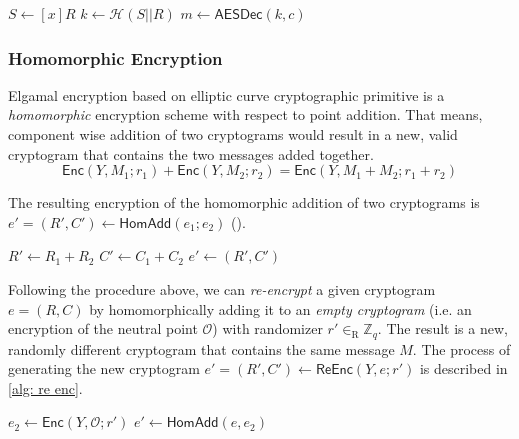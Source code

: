 \begin{algorithm}[ht]
    \DontPrintSemicolon
    \caption{$\mathsf{TxtDec} (x, e)$}
    
    $S \gets [x]R$ \;
    $k \gets \mathcal{H} (S || R)$ \;
    $m \gets \mathsf{AESDec} (k, c)$ \;
     
    
    \label{alg: txt dec}
\end{algorithm}


\subsubsection{Homomorphic Encryption}
Elgamal encryption based on elliptic curve cryptographic primitive is a \textit{homomorphic} encryption scheme with respect to point addition. That means, component wise addition of two cryptograms would result in a new, valid cryptogram that contains the two messages added together.
\[
\mathsf{Enc}(Y, M_1; r_1) + \mathsf{Enc}(Y, M_2; r_2) = \mathsf{Enc}(Y, M_1 + M_2; r_1 + r_2)
\]

The resulting encryption of the homomorphic addition of two cryptograms is $e' = (R', C') \gets \mathsf{HomAdd} (e_1; e_2)$ ().

\begin{algorithm}[ht]
    \DontPrintSemicolon
    \caption{$\mathsf{HomAdd}(e_1; e_2)$}
    
    $R' \gets R_1 + R_2$ \;
    $C' \gets C_1 + C_2$ \;
    $e' \gets (R', C')$\;
     
    
    \label{alg: hom add}
\end{algorithm}

Following the procedure above, we can \textit{re-encrypt} a given cryptogram $e = (R, C)$ by homomorphically adding it to an \textit{empty cryptogram} (i.e. an encryption of the neutral point $\mathcal{O}$) with randomizer $r' \in_\mathrm{R} \mathbb{Z}_q$. The result is a new, randomly different cryptogram that contains the same message $M$. The process of generating the new cryptogram $e' = (R', C') \gets \mathsf{ReEnc} (Y, e; r')$ is described in \cref{alg: re enc}.

\begin{algorithm}[ht]
    \DontPrintSemicolon
    \caption{$\mathsf{ReEnc} (Y, e; r')$}
    
    $e_2 \gets \mathsf{Enc}(Y, \mathcal{O}; r')$ 
    $e' \gets \mathsf{HomAdd} (e, e_2)$ 
     
    
    \label{alg: re enc}
\end{algorithm}

